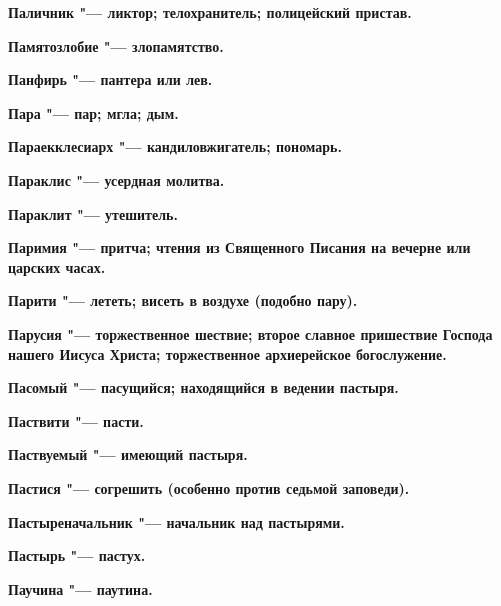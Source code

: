 \bfseries Паличник \normalfont{} "--- ликтор; телохранитель; полицейский пристав. 




\bfseries Памятозлобие \normalfont{} "--- злопамятство. 




\bfseries Панфирь \normalfont{} "--- пантера или лев. 




\bfseries Пара \normalfont{} "--- пар; мгла; дым. 




\bfseries Параекклесиарх \normalfont{} "--- кандиловжигатель; пономарь. 




\bfseries Параклис \normalfont{} "--- усердная молитва. 




\bfseries Параклит \normalfont{} "--- утешитель. 




\bfseries Паримия \normalfont{} "--- притча; чтения из Священного Писания на вечерне или царских часах. 




\bfseries Парити \normalfont{} "--- лететь; висеть в воздухе (подобно пару). 




\bfseries Парусия \normalfont{} "--- торжественное шествие; второе славное пришествие Господа нашего Иисуса Христа; торжественное архиерейское богослужение. 




\bfseries Пасомый \normalfont{} "--- пасущийся; находящийся в ведении пастыря. 




\bfseries Паствити \normalfont{} "--- пасти. 




\bfseries Паствуемый \normalfont{} "--- имеющий пастыря. 




\bfseries Пастися \normalfont{} "--- согрешить (особенно против седьмой заповеди). 




\bfseries Пастыреначальник \normalfont{} "--- начальник над пастырями. 




\bfseries Пастырь \normalfont{} "--- пастух. 




\bfseries Паучина \normalfont{} "--- паутина. 




